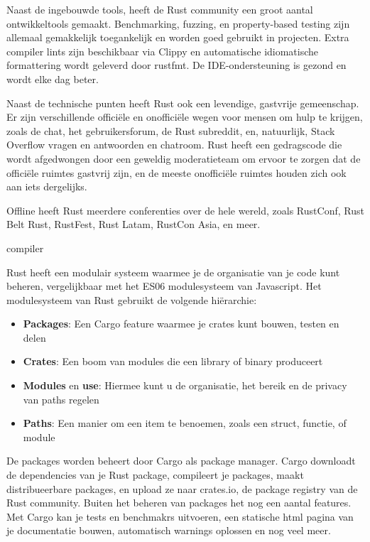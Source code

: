 Naast de ingebouwde tools, heeft de Rust community een groot aantal ontwikkeltools gemaakt.
Benchmarking, fuzzing, en property-based testing zijn allemaal gemakkelijk toegankelijk en worden
goed gebruikt in projecten. Extra compiler lints zijn beschikbaar via Clippy en automatische
idiomatische formattering wordt geleverd door rustfmt. De IDE-ondersteuning is gezond en wordt elke
dag beter.

Naast de technische punten heeft Rust ook een levendige, gastvrije gemeenschap. Er zijn
verschillende officiële en onofficiële wegen voor mensen om hulp te krijgen, zoals de chat, het
gebruikersforum, de Rust subreddit, en, natuurlijk, Stack Overflow vragen en antwoorden en chatroom.
Rust heeft een gedragscode die wordt afgedwongen door een geweldig moderatieteam om ervoor te zorgen
dat de officiële ruimtes gastvrij zijn, en de meeste onofficiële ruimtes houden zich ook aan iets
dergelijks.

Offline heeft Rust meerdere conferenties over de hele wereld, zoals RustConf, Rust Belt Rust,
RustFest, Rust Latam, RustCon Asia, en meer.


compiler

Rust heeft een modulair systeem waarmee je de organisatie van je code kunt beheren, vergelijkbaar
met het ES06 modulesysteem van Javascript. \cite{js_modules} \cite{rust_packages} Het modulesysteem
van Rust gebruikt de volgende hiërarchie:
\begin{itemize}
  \item \textbf{Packages}: Een Cargo feature waarmee je crates kunt bouwen, testen en delen
  \item \textbf{Crates}: Een boom van modules die een library of binary produceert
  \item \textbf{Modules} en \textbf{use}: Hiermee kunt u de organisatie, het bereik en de privacy
    van paths regelen
  \item \textbf{Paths}: Een manier om een item te benoemen, zoals een struct, functie, of module
\end{itemize}

De packages worden beheert door Cargo als package manager. Cargo downloadt de dependencies van je
Rust package, compileert je packages, maakt distribueerbare packages, en upload ze naar crates.io,
de package registry van de Rust community. Buiten het beheren van packages het nog een aantal
features. Met Cargo kan je tests en benchmakrs uitvoeren, een statische html pagina van je
documentatie bouwen, automatisch warnings oplossen en nog veel meer.

